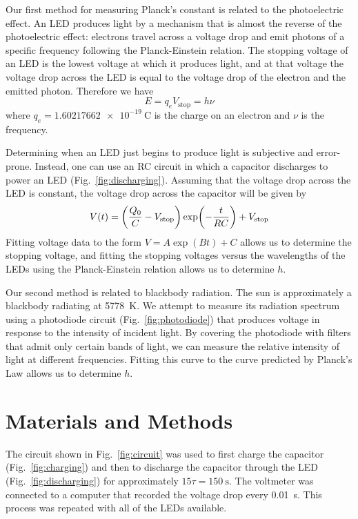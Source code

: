 \documentclass{lab}
\begin{document}
Our first method for measuring Planck's constant is related to the photoelectric
effect. An LED produces light by a mechanism that is almost the reverse of the
photoelectric effect: electrons travel across a voltage drop and emit photons of
a specific frequency following the Planck-Einstein relation. The stopping
voltage of an LED is the lowest voltage at which it produces light, and at that
voltage the voltage drop across the LED is equal to the voltage drop of the
electron and the emitted photon. Therefore we have
\begin{equation}
  E = q_e V_{\text{stop}} = h\nu
\end{equation}
where $q_e = \SI{1.60217662e-19}{\coulomb}$ is the charge on an electron and $\nu$
is the frequency.

Determining when an LED just begins to produce light is subjective and
error-prone. Instead, one can use an RC circuit in which a capacitor discharges
to power an LED (Fig.~\ref{fig:discharging}). Assuming that the voltage drop
across the LED is constant, the voltage drop across the capacitor will be given
by
\begin{equation}
  V(t) = \qty(\frac{Q_0}{C} - V_{\text{stop}}) \exp(-\frac{t}{RC}) + V_{\text{stop}}
  \label{eq:led_cap}
\end{equation}
Fitting voltage data to the form $V = A\exp(Bt) + C$ allows us to determine the
stopping voltage, and fitting the stopping voltages versus the wavelengths of
the LEDs using the Planck-Einstein relation allows us to determine $h$.

Our second method is related to blackbody radiation. The sun is approximately a
blackbody radiating at \SI{5778}{\kelvin}. We attempt to measure its radiation
spectrum using a photodiode circuit (Fig.~\ref{fig:photodiode}) that produces
voltage in response to the intensity of incident light. By covering the
photodiode with filters that admit only certain bands of light, we can measure
the relative intensity of light at different frequencies. Fitting this curve to
the curve predicted by Planck's Law allows us to determine $h$.

\section{Materials and Methods}
\label{Sec:MatsMeths}

The circuit shown in Fig.~\ref{fig:circuit} was used to first charge the
capacitor (Fig.~\ref{fig:charging}) and then to discharge the capacitor through
the LED (Fig.~\ref{fig:discharging}) for approximately $15\tau =
\SI{150}{\second}$. The voltmeter was connected to a computer that recorded the
voltage drop every \SI{0.01}{\second}. This process was repeated with all of the
LEDs available.
\end{document}
